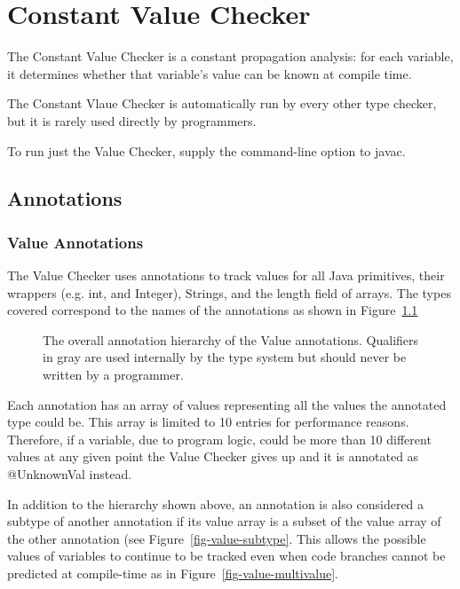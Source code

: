 \htmlhr
\chapter{Constant Value Checker\label{value-checker}}

The Constant Value Checker is a constant propagation analysis: for
each variable, it determines whether that variable's value can be
known at compile time.


The Constant Vlaue Checker is automatically run by every other type
checker, but it is rarely used directly by programmers.

To run just the Value Checker, supply the
command-line option to javac.

\section{Annotations}
\subsection{Value Annotations}

The Value Checker uses annotations to track values for all Java
primitives, their wrappers (e.g. int, and Integer), Strings, and the
length field of arrays. The types covered correspond to the names of
the annotations as shown in Figure~\ref{fig-value-hierarchy}

\begin{figure}
\caption{The overall annotation hierarchy of the Value
annotations. Qualifiers in gray are used
internally by the type system but should never be written by a
programmer.}
\label{fig-value-hierarchy}
\end{figure}

Each annotation has an array of values representing all the values the
annotated type could be. This array is limited to 10 entries for
performance reasons. Therefore, if a variable, due to program logic,
could be more than 10 different values at any given point the Value
Checker gives up and it is annotated as @UnknownVal instead.

In addition to the hierarchy shown above, an annotation is also
considered a subtype of another annotation if its value array is a
subset of the value array of the other annotation (see
Figure~\ref{fig-value-subtype}. This allows the possible values of
variables to continue to be tracked even when code branches cannot be
predicted at compile-time as in Figure~\ref{fig-value-multivalue}.

